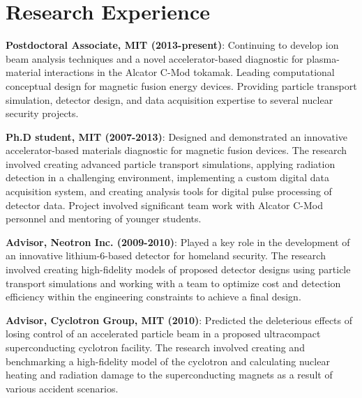 \documentclass[10pt]{article}
\begin{document}
\section{Research Experience}
\begin{innerlist}
\item \textbf{Postdoctoral Associate, MIT (2013-present)}: Continuing
  to develop ion beam analysis techniques and a novel
  accelerator-based diagnostic for plasma-material interactions in the
  Alcator C-Mod tokamak. Leading computational conceptual design for
  magnetic fusion energy devices. Providing particle transport
  simulation, detector design, and data acquisition expertise to
  several nuclear security projects.
  \vspace{0.2cm}


\item \textbf{Ph.D student, MIT (2007-2013)}: Designed and
  demonstrated an innovative accelerator-based materials diagnostic
  for magnetic fusion devices. The research involved creating advanced
  particle transport simulations, applying radiation detection in a
  challenging environment, implementing a custom digital data
  acquisition system, and creating analysis tools for digital pulse
  processing of detector data. Project involved significant team work
  with Alcator C-Mod personnel and mentoring of younger
  students.\vspace{0.2cm}

\item \textbf{Advisor, Neotron Inc. (2009-2010)}: Played a key role
  in the development of an innovative lithium-6-based detector for
  homeland security. The research involved creating high-fidelity
  models of proposed detector designs using particle transport
  simulations and working with a team to optimize cost and detection
  efficiency within the engineering constraints to achieve a final
  design.\vspace{0.2cm}
  
\item \textbf{Advisor, Cyclotron Group, MIT (2010)}: Predicted the
  deleterious effects of losing control of an accelerated particle
  beam in a proposed ultracompact superconducting cyclotron
  facility. The research involved creating and benchmarking a
  high-fidelity model of the cyclotron and calculating nuclear heating
  and radiation damage to the superconducting magnets as a result of
  various accident scenarios.\vspace{0.2cm}


\end{innerlist}
\end{document}
